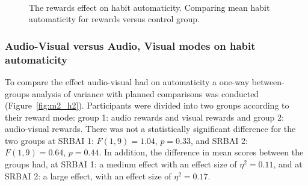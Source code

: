 \documentclass{scaffold/sigchi}
\begin{document}
\begin{figure}
  \centering
  \caption{The rewards effect on habit automaticity. Comparing mean habit automaticity for rewards versus control group.}~\label{fig:m2_h1}
\end{figure}

\subsubsection{Audio-Visual versus Audio, Visual modes on habit automaticity}
To compare the effect audio-visual had on automaticity a one-way between-groups analysis of variance with planned comparisons was conducted (Figure~\ref{fig:m2_h2}). Participants were divided into two groups according to their reward mode: group 1: audio rewards and visual rewards and group 2: audio-visual rewards. There was not a
statistically significant difference for the two groups at SRBAI 1: $ F(1,9) = 1.04$, $p = 0.33$, and SRBAI 2: $F(1,9) = 0.64$, $p = 0.44$. In addition, the difference in mean scores between the groups had, at SRBAI 1: a medium effect with an effect size of $\eta^{2} = 0.11$, and at SRBAI 2: a large effect, with an effect size of $\eta^{2} = 0.17$.
\end{document}
